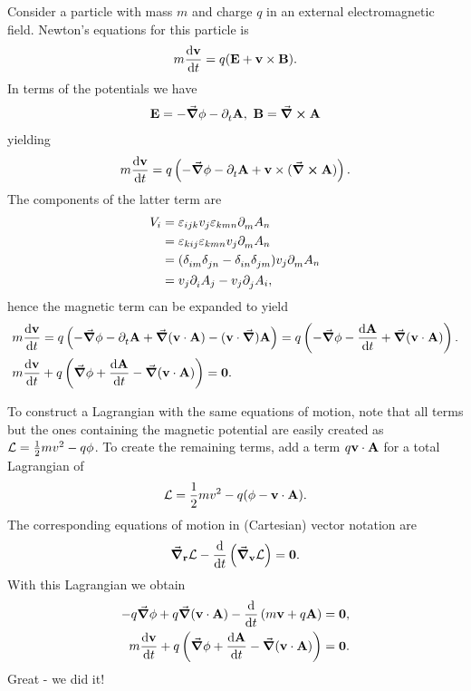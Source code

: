 Consider a particle with mass $m$ and charge $q$ in an external electromagnetic field. Newton's equations for this particle is
\begin{align*}
	m\dv{\vb{v}}{t} = q(\vb{E} + \vb{v}\times\vb{B}).
\end{align*}
In terms of the potentials we have
\begin{align*}
	\vb{E} = -\grad{\phi} - \partial^{}_{t}\vb{A},\ \vb{B} = \curl{\vb{A}}
\end{align*}
yielding
\begin{align*}
	m\dv{\vb{v}}{t} = q\left(-\grad{\phi} - \partial^{}_{t}\vb{A} + \vb{v}\times(\curl{\vb{A}})\right).
\end{align*}
The components of the latter term are
\begin{align}
	V_{i} &= \varepsilon_{ijk}v_{j}\varepsilon_{kmn}\partial^{}_{m}A_{n} \\
	      &= \varepsilon_{kij}\varepsilon_{kmn}v_{j}\partial^{}_{m}A_{n} \\
	      &= (\delta_{im}^{}\delta_{jn}^{} - \delta_{in}^{}\delta_{jm}^{})v_{j}\partial^{}_{m}A_{n} \\
	      &= v_{j}\partial^{}_{i}A_{j} - v_{j}\partial^{}_{j}A_{i},
\end{align}
hence the magnetic term can be expanded to yield
\begin{align*}
	&m\dv{\vb{v}}{t} = q\left(-\grad{\phi} - \partial^{}_{t}\vb{A} + \grad{(\vb{v}\cdot\vb{A})} - (\vb{v}\cdot\grad)\vb{A}\right) = q\left(-\grad{\phi} - \dv{\vb{A}}{t} + \grad{(\vb{v}\cdot\vb{A})}\right). \\
	&m\dv{\vb{v}}{t} + q\left(\grad{\phi} + \dv{\vb{A}}{t} - \grad{(\vb{v}\cdot\vb{A})}\right) = \vb{0}.
\end{align*}

To construct a Lagrangian with the same equations of motion, note that all terms but the ones containing the magnetic potential are easily created as $\mathcal{L} = \frac{1}{2}mv^{2} - q\phi$. To create the remaining terms, add a term $q\vb{v}\cdot\vb{A}$ for a total Lagrangian of
\begin{align*}
	\mathcal{L} = \frac{1}{2}mv^{2} - q(\phi - \vb{v}\cdot\vb{A}).
\end{align*}
The corresponding equations of motion in (Cartesian) vector notation are
\begin{align*}
	\grad_{\vb{r}}{\mathcal{L}} - \dv{t}\left(\grad_{\vb{v}}{\mathcal{L}}\right) = \vb{0}.
\end{align*}
With this Lagrangian we obtain
\begin{align*}
	-q\grad{\phi} + q\grad{(\vb{v}\cdot\vb{A})} - \dv{t}\left(m\vb{v} + q\vb{A}\right) = \vb{0}, \\
	m\dv{\vb{v}}{t} + q\left(\grad{\phi} + \dv{\vb{A}}{t} - \grad{(\vb{v}\cdot\vb{A})}\right) = \vb{0}.
\end{align*}
Great - we did it!


